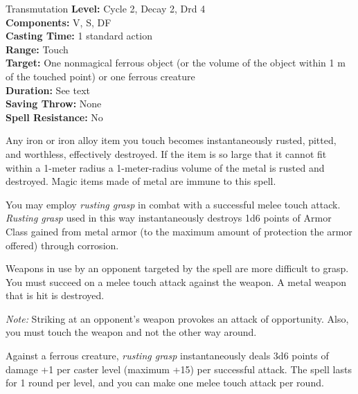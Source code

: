 {Transmutation}
{
	\textbf{Level:}
	Cycle 2, Decay 2, Drd 4\\
	\textbf{Components:}
	V, S, DF\\
	\textbf{Casting Time:}
	1 standard action\\
	\textbf{Range:}
	Touch\\
	\textbf{Target:}
	One nonmagical ferrous object (or the volume of the object within 1 m of the touched point) or one ferrous creature\\
	\textbf{Duration:}
	See text\\
	\textbf{Saving Throw:}
	None\\
	\textbf{Spell Resistance:}
	No\\
}
{
	Any iron or iron alloy item you touch becomes instantaneously rusted, pitted, and worthless, effectively destroyed. If the item is so large that it cannot fit within a 1-meter radius a 1-meter-radius volume of the metal is rusted and destroyed. Magic items made of metal are immune to this spell.

	You may employ \emph{rusting grasp} in combat with a successful melee touch attack. \emph{Rusting grasp} used in this way instantaneously destroys 1d6 points of Armor Class gained from metal armor (to the maximum amount of protection the armor offered) through corrosion.

	Weapons in use by an opponent targeted by the spell are more difficult to grasp. You must succeed on a melee touch attack against the weapon. A metal weapon that is hit is destroyed.

	\textit{Note:} Striking at an opponent's weapon provokes an attack of opportunity. Also, you must touch the weapon and not the other way around.

	Against a ferrous creature, \emph{rusting grasp} instantaneously deals 3d6 points of damage +1 per caster level (maximum +15) per successful attack. The spell lasts for 1 round per level, and you can make one melee touch attack per round.

}
